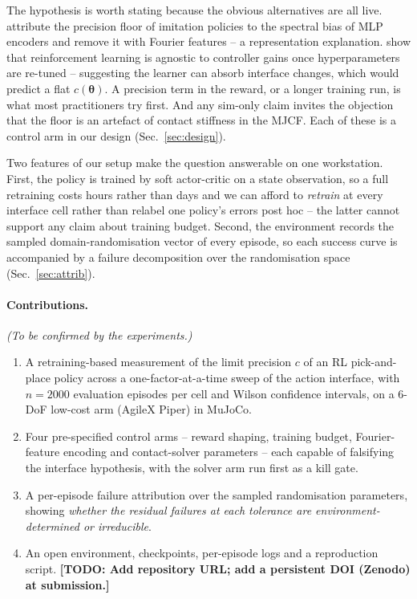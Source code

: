 \documentclass{article}
\newcommand{\todo}[1]{{\color{red}\textbf{[TODO: #1]}}}
\newcommand{\planned}[1]{{\color{blue!70!black}\textit{#1}}}
\newcommand{\iface}{\boldsymbol{\theta}}
\begin{document}
The hypothesis is worth stating because the obvious alternatives are all live. \citet{gyenes2026fourier} attribute the precision floor of imitation policies to the spectral bias of MLP encoders and remove it with Fourier features -- a representation explanation. \citet{bronars2026tune} show that reinforcement learning is agnostic to controller gains once hyperparameters are re-tuned -- suggesting the learner can absorb interface changes, which would predict a flat $c(\iface)$. A precision term in the reward, or a longer training run, is what most practitioners try first. And any sim-only claim invites the objection that the floor is an artefact of contact stiffness in the MJCF. Each of these is a control arm in our design (Sec.~\ref{sec:design}).

Two features of our setup make the question answerable on one workstation. First, the policy is trained by soft actor-critic \citep{haarnoja2018sac} on a state observation, so a full retraining costs hours rather than days and we can afford to \emph{retrain} at every interface cell rather than relabel one policy's errors post hoc -- the latter cannot support any claim about training budget. Second, the environment records the sampled domain-randomisation vector of every episode, so each success curve is accompanied by a failure decomposition over the randomisation space (Sec.~\ref{sec:attrib}).

\paragraph{Contributions.} \planned{(To be confirmed by the experiments.)}
\begin{enumerate}[nosep,leftmargin=*]
\item A retraining-based measurement of the limit precision $c$ of an RL pick-and-place policy across a one-factor-at-a-time sweep of the action interface, with $n{=}2000$ evaluation episodes per cell and Wilson confidence intervals, on a 6-DoF low-cost arm (AgileX Piper) in MuJoCo.
\item Four pre-specified control arms -- reward shaping, training budget, Fourier-feature encoding and contact-solver parameters -- each capable of falsifying the interface hypothesis, with the solver arm run first as a kill gate.
\item A per-episode failure attribution over the sampled randomisation parameters, showing \planned{whether the residual failures at each tolerance are environment-determined or irreducible}.
\item An open environment, checkpoints, per-episode logs and a reproduction script. \todo{Add repository URL; add a persistent DOI (Zenodo) at submission.}
\end{enumerate}
\end{document}
